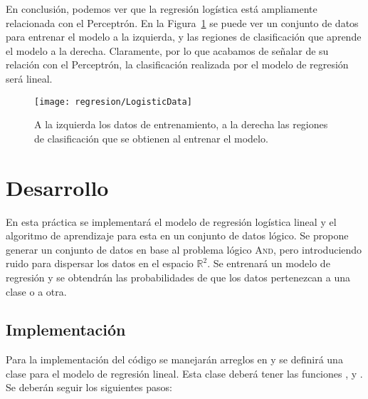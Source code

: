 En conclusión, podemos ver que la regresión logística está ampliamente relacionada con el Perceptrón. En la Figura~\ref{Fig:LogistData} se puede ver un conjunto de datos para entrenar el modelo a la izquierda, y las regiones de clasificación que aprende el modelo a la derecha. Claramente, por lo que acabamos de señalar de su relación con el Perceptrón, la clasificación realizada por el modelo de regresión será lineal.

\begin{figure}
 \centering
 \texttt{[image: regresion/LogisticData]}
 \caption{A la izquierda los datos de entrenamiento, a la derecha las regiones de clasificación que se obtienen al entrenar el modelo.}\label{Fig:LogistData}
\end{figure}






\section{Desarrollo}

En esta práctica se implementará el modelo de regresión logística lineal y el algoritmo de aprendizaje para esta en un conjunto de datos lógico. Se propone generar un conjunto de datos en base al problema lógico \textsc{And}, pero introduciendo ruido para dispersar los datos en el espacio $\mathbb{R}^2$. Se entrenará un modelo de regresión y se obtendrán las probabilidades de que los datos pertenezcan a una clase o a otra.



\subsection{Implementación}

Para la implementación del código se manejarán arreglos en  y se definirá una clase para el modelo de regresión lineal. Esta clase deberá tener las funciones ,  y . Se deberán seguir los siguientes pasos:


